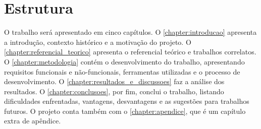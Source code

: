 


\section{Estrutura}
O trabalho será apresentado em cinco capítulos. O \autoref{chapter:introducao} apresenta a introdução, contexto histórico e a motivação do projeto. O \autoref{chapter:referencial_teorico} apresenta o referencial teórico e trabalhos correlatos. O \autoref{chapter:metodologia} contém o desenvolvimento do trabalho, apresentando requisitos funcionais e não-funcionais, ferramentas utilizadas e o processo de desenvolvimento. O \autoref{chapter:resultados_e_discussoes} faz a análise dos resultados. O \autoref{chapter:conclusoes}, por fim, conclui o trabalho, listando dificuldades enfrentadas, vantagens, desvantagens e as sugestões para trabalhos futuros. O projeto conta também com o \autoref{chapter:apendice}, que é um capítulo extra de apêndice.
